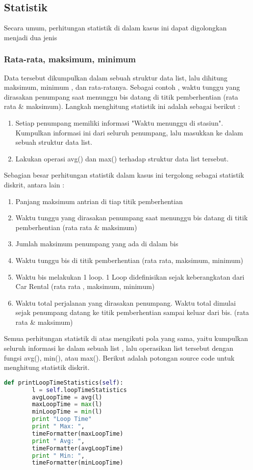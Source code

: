 \documentclass{article}
\begin{document}
\subsection{Statistik}
Secara umum, perhitungan statistik di dalam kasus ini dapat digolongkan menjadi dua jenis

\subsubsection{Rata-rata, maksimum, minimum}
Data tersebut dikumpulkan dalam sebuah struktur data list, lalu dihitung maksimum, minimum , dan rata-ratanya.
Sebagai contoh , waktu tunggu yang dirasakan penumpang saat menunggu bis datang di titik pemberhentian (rata rata \& maksimum).
Langkah menghitung statistik ini adalah sebagai berikut :
\begin{enumerate}
\item Setiap penumpang memiliki informasi "Waktu menunggu di stasiun". Kumpulkan informasi ini dari seluruh penumpang, lalu masukkan ke dalam sebuah struktur data list.
\item Lakukan operasi avg() dan max() terhadap struktur data list tersebut.
\end{enumerate}
Sebagian besar perhitungan statistik dalam kasus ini tergolong sebagai statistik diskrit, antara lain :
	\begin{enumerate}
	\item Panjang maksimum antrian di tiap titik pemberhentian 
	\item Waktu tunggu yang dirasakan penumpang saat menunggu bis datang di titik pemberhentian (rata rata \& maksimum)
	\item Jumlah maksimum penumpang yang ada di dalam bis 
	\item Waktu tunggu bis di titik pemberhentian (rata rata, maksimum, minimum)
	\item Waktu bis melakukan 1 loop. 1 Loop didefinisikan sejak keberangkatan dari Car Rental (rata rata , maksimum, minimum)
	\item Waktu total perjalanan yang dirasakan penumpang. Waktu total dimulai sejak penumpang datang ke titik pemberhentian sampai keluar dari bis. (rata rata \& maksimum)
	\end{enumerate}
	Semua perhitungan statistik di atas mengikuti pola yang sama, yaitu kumpulkan seluruh informasi ke dalam sebuah list , lalu operasikan list tersebut dengan fungsi avg(), min(), atau max(). Berikut adalah potongan source code untuk menghitung statistik diskrit.
\begin{lstlisting}[language=Python]
def printLoopTimeStatistics(self):
		l = self.loopTimeStatistics
		avgLoopTime = avg(l)
		maxLoopTime = max(l)
		minLoopTime = min(l)
		print "Loop Time"
		print "	Max: ",
		timeFormatter(maxLoopTime)
		print "	Avg: ",
		timeFormatter(avgLoopTime)			
		print "	Min: ",
		timeFormatter(minLoopTime)
\end{lstlisting}
\end{document}
